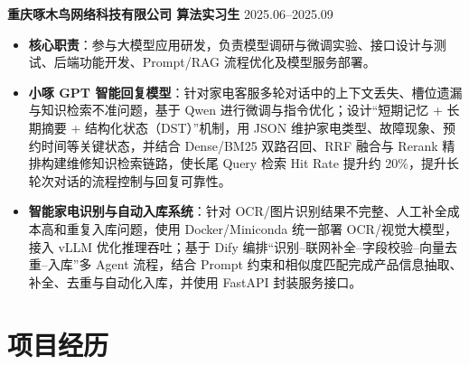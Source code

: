 \documentclass[10pt]{article}
\newlength{\iconwidth}
\begin{document}
    {\large \textbf{重庆啄木鸟网络科技有限公司 \quad 算法实习生}} \hfill 2025.06--2025.09
    \begin{itemize}
        \item \textbf{核心职责}：参与大模型应用研发，负责模型调研与微调实验、接口设计与测试、后端功能开发、Prompt/RAG 流程优化及模型服务部署。
        \item \textbf{小啄 GPT 智能回复模型}：针对家电客服多轮对话中的上下文丢失、槽位遗漏与知识检索不准问题，基于 Qwen 进行微调与指令优化；设计“短期记忆 + 长期摘要 + 结构化状态（DST）”机制，用 JSON 维护家电类型、故障现象、预约时间等关键状态，并结合 Dense/BM25 双路召回、RRF 融合与 Rerank 精排构建维修知识检索链路，使长尾 Query 检索 Hit Rate 提升约 20\%，提升长轮次对话的流程控制与回复可靠性。
        \item \textbf{智能家电识别与自动入库系统}：针对 OCR/图片识别结果不完整、人工补全成本高和重复入库问题，使用 Docker/Miniconda 统一部署 OCR/视觉大模型，接入 vLLM 优化推理吞吐；基于 Dify 编排“识别--联网补全--字段校验--向量去重--入库”多 Agent 流程，结合 Prompt 约束和相似度匹配完成产品信息抽取、补全、去重与自动化入库，并使用 FastAPI 封装服务接口。
    \end{itemize}

    \vspace{0.45em}


    \section[项目经历]{\makebox[\iconwidth][c]{\color{primarycolor}{\faProjectDiagram}}\quad 项目经历}
\end{document}
